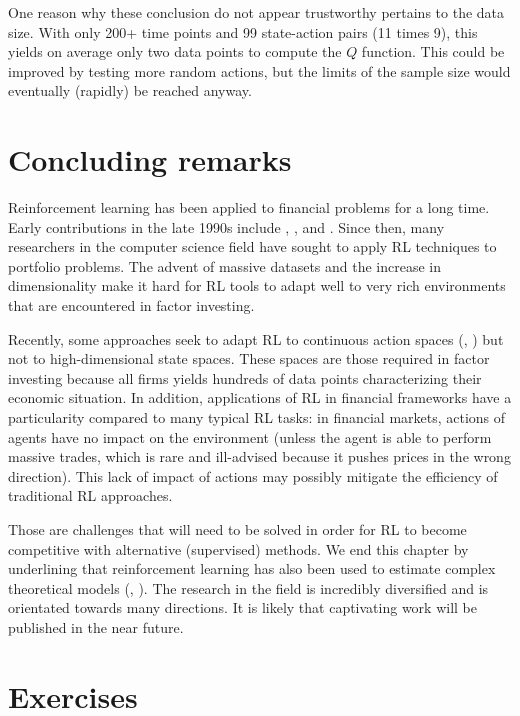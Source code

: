 \documentclass[]{krantz}
\theoremstyle{definition}
\theoremstyle{definition}
\theoremstyle{definition}
\theoremstyle{remark}
\begin{document}
One reason why these conclusion do not appear trustworthy pertains to
the data size. With only 200+ time points and 99 state-action pairs (11
times 9), this yields on average only two data points to compute the
\(Q\) function. This could be improved by testing more random actions,
but the limits of the sample size would eventually (rapidly) be reached
anyway.

\hypertarget{concluding-remarks}{%
\section{Concluding remarks}\label{concluding-remarks}}

Reinforcement learning has been applied to financial problems for a long
time. Early contributions in the late 1990s include
\citet{neuneier1996optimal}, \citet{moody1997optimization},
\citet{moody1998performance} and \citet{neuneier1998enhancing}. Since
then, many researchers in the computer science field have sought to
apply RL techniques to portfolio problems. The advent of massive
datasets and the increase in dimensionality make it hard for RL tools to
adapt well to very rich environments that are encountered in factor
investing.

Recently, some approaches seek to adapt RL to continuous action spaces
(\citet{wang2019continuous}, \citet{aboussalah2020continuous}) but not
to high-dimensional state spaces. These spaces are those required in
factor investing because all firms yields hundreds of data points
characterizing their economic situation. In addition, applications of RL
in financial frameworks have a particularity compared to many typical RL
tasks: in financial markets, actions of agents have no impact on the
environment (unless the agent is able to perform massive trades, which
is rare and ill-advised because it pushes prices in the wrong
direction). This lack of impact of actions may possibly mitigate the
efficiency of traditional RL approaches.

Those are challenges that will need to be solved in order for RL to
become competitive with alternative (supervised) methods. We end this
chapter by underlining that reinforcement learning has also been used to
estimate complex theoretical models (\citet{halperin2018market},
\citet{garcia2019continuous}). The research in the field is incredibly
diversified and is orientated towards many directions. It is likely that
captivating work will be published in the near future.

\hypertarget{exercises}{%
\section{Exercises}\label{exercises}}
\end{document}
